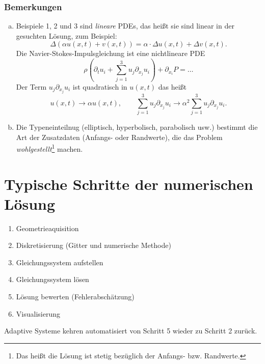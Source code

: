 \subsubsection*{Bemerkungen}
\begin{enumerate}[(a)]
\item Beispiele 1, 2 und 3 sind \emph{lineare} PDEs, das heißt sie sind linear
  in der gesuchten Lösung, zum Beispiel:
  \[ \Delta( \alpha u(x,t) + v(x,t) )
    = \alpha \cdot \Delta u(x,t) + \Delta v(x,t). \]
  Die Navier-Stokes-Impulsgleichung ist eine nichtlineare PDE
  \[ \rho \left( \partial_t u_i + \sum_{j=1}^3 u_j \partial_{x_j} u_i \right)
    + \partial_{x_i} P = \ldots \]
  Der Term $u_j \partial_{x_j} u_i$ ist quadratisch in $u(x,t)$ das heißt
  \[ u(x,t) \to \alpha u(x,t), \qquad
    \sum_{j=1}^3 u_j \partial_{x_j} u_i \to \alpha^2
    \sum_{j=1}^3 u_j \partial_{x_j} u_i. \]
\item Die Typeneinteilnug (elliptisch, hyperbolisch, parabolisch usw.) bestimmt
  die Art der Zusatzdaten (Anfangs- oder Randwerte), die das Problem
  \emph{wohlgestellt}\footnote{%
    Das heißt die Lösung ist stetig bezüglich der Anfangs- bzw. Randwerte.
  } machen.
\end{enumerate}

\section{Typische Schritte der numerischen Lösung}
\begin{enumerate}
\item Geometrieaquisition
\item Diskretisierung (Gitter und numerische Methode)
\item Gleichungssystem aufstellen
\item Gleichungssystem lösen
\item Lösung bewerten (Fehlerabschätzung)
\item Visualisierung
\end{enumerate}
Adaptive Systeme kehren automatisiert von Schritt 5 wieder zu Schritt 2 zurück.

